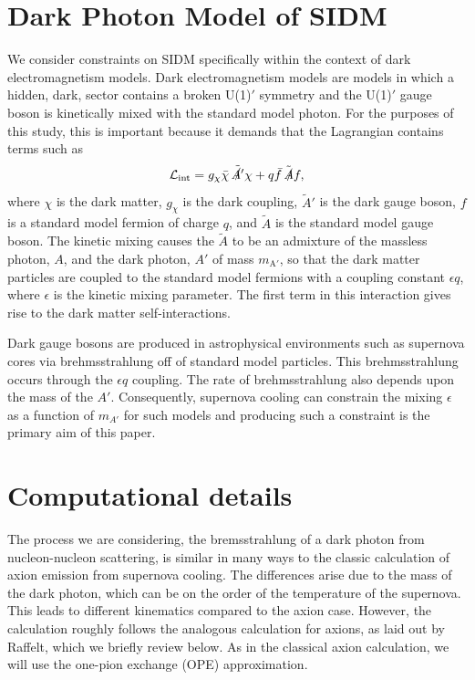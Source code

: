 \documentclass[nofootinbib,prd,superscriptaddress,twocolumn]{revtex4}
\begin{document}
\section{Dark Photon Model of SIDM}
\label{section:model}

We consider constraints on SIDM specifically within the context of dark electromagnetism models. 
Dark electromagnetism models are models in which a hidden, dark, sector contains a broken U(1)$'$ 
symmetry and the U(1)$'$ gauge boson is kinetically mixed with the standard model photon. For the 
purposes of this study, this is important because it demands that the Lagrangian contains terms such as 
%
\begin{equation}
\mathcal{L}_{\mathrm{int}} = g_{\chi} \bar{\chi} \, \tilde{\slashed{A'} } \chi + q \bar{f}\, \tilde{\slashed{A} } f, 
\end{equation}
%
where $\chi$ is the dark matter, $g_{\chi}$ is the dark coupling, $\tilde{A}'$ is the dark gauge boson, 
$f$ is a standard model fermion of charge $q$, and $\tilde{A}$ is the standard model gauge boson. 
The kinetic mixing causes the $\tilde{A}$ to be an admixture of the massless photon, $A$, and 
the dark photon, $A'$ of mass $m_{\mathrm{A'}}$, so that the dark matter particles are coupled to the standard model 
fermions with a coupling constant $\epsilon q$, where $\epsilon$ is the kinetic mixing parameter. 
The first term in this interaction gives rise to the dark matter self-interactions. 

Dark gauge bosons are produced in astrophysical environments such as supernova 
cores via brehmsstrahlung off of standard model particles. This brehmsstrahlung 
occurs through the $\epsilon q$ coupling. The rate of brehmsstrahlung 
also depends upon the mass of the $A'$. Consequently, 
supernova cooling can constrain the mixing $\epsilon$ as a function of 
$m_{A'}$ for such models and producing such a constraint is the 
primary aim of this paper.


\section{Computational details}
\label{section:computational}
	
	The process we are considering, the bremsstrahlung of a dark photon from nucleon-nucleon scattering, is similar in many ways to the classic calculation of axion emission from supernova cooling. The differences arise due to the mass of the dark photon, which can be on the order of the temperature of the supernova.  This leads to different kinematics compared to the axion case.  However, the calculation roughly follows the analogous calculation for axions, as laid out by Raffelt, which we briefly review below.  As in the classical axion calculation, we will use the one-pion exchange (OPE) approximation.  
	
\end{document}
